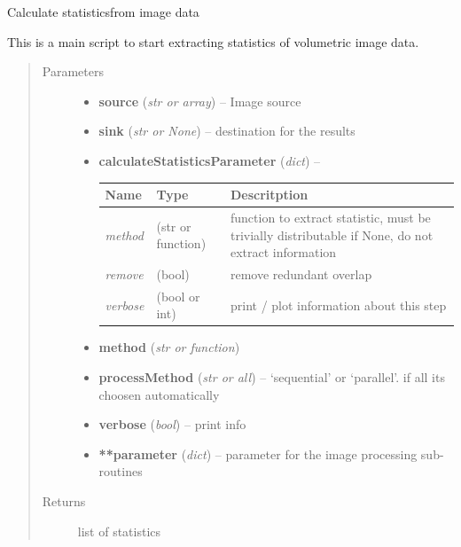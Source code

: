 \documentclass[letterpaper,10pt,english]{sphinxmanual}
\begin{document}
\begin{fulllineitems}
\label{api/ClearMap.ImageProcessing:ClearMap.ImageProcessing.ImageStatistics.calculateStatistics}
Calculate statisticsfrom image data

This is a main script to start extracting statistics of volumetric image data.
\begin{quote}\begin{description}
\item[{Parameters}] \leavevmode\begin{itemize}
\item {} 
\textbf{source} (\emph{str or array}) --
Image source

\item {} 
\textbf{sink} (\emph{str or None}) --
destination for the results

\item {} 
\textbf{calculateStatisticsParameter} (\emph{dict}) --

\begin{tabulary}{\linewidth}{|L|L|L|}
\hline
\textsf{\relax 
Name
} & \textsf{\relax 
Type
} & \textsf{\relax 
Descritption
}\\
\hline
\emph{method}
 & 
(str or function)
 & 
function to extract statistic, must be trivially distributable
if None, do not extract information
\\
\hline
\emph{remove}
 & 
(bool)
 & 
remove redundant overlap
\\
\hline
\emph{verbose}
 & 
(bool or int)
 & 
print / plot information about this step
\\
\hline\end{tabulary}


\item {} 
\textbf{method} (\emph{str or function})

\item {} 
\textbf{processMethod} (\emph{str or all}) --
`sequential' or `parallel'. if all its choosen automatically

\item {} 
\textbf{verbose} (\emph{bool}) --
print info

\item {} 
\textbf{**parameter} (\emph{dict}) --
parameter for the image processing sub-routines

\end{itemize}

\item[{Returns}] \leavevmode
list of statistics

\end{description}\end{quote}

\end{fulllineitems}
\end{document}
